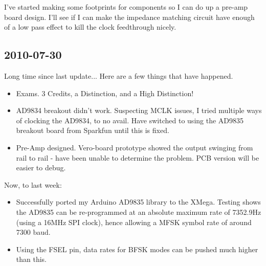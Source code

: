 \documentclass[a4paper,10pt]{article}
\begin{document}
I've started making some footprints for components so I can do up a pre-amp board design. I'll see if I can make the impedance matching circuit have enough of a low pass effect to kill the clock feedthrough nicely. 

\subsection{2010-07-30}
Long time since last update... Here are a few things that have happened.

\begin{itemize}
\item Exams. 3 Credits, a Distinction, and a High Distinction!
\item AD9834 breakout didn't work. Suspecting MCLK issues, I tried multiple ways of clocking the AD9834, to no avail. Have switched to using the AD9835 breakout board from Sparkfun until this is fixed.
\item Pre-Amp designed. Vero-board prototype showed the output swinging from rail to rail - have been unable to determine the problem. PCB version will be easier to debug.
\end{itemize}

Now, to last week:
\begin{itemize}
\item Successfully ported my Arduino AD9835 library to the XMega. Testing shows the AD9835 can be re-programmed at an absolute maximum rate of 7352.9Hz (using a 16MHz SPI clock), hence allowing a MFSK symbol rate of around 7300 baud.
\item Using the FSEL pin, data rates for BFSK modes can be pushed much higher than this.
\end{itemize}
\end{document}

